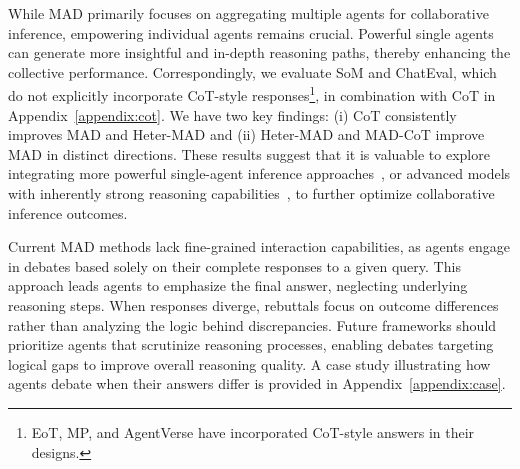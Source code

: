  While MAD primarily focuses on aggregating multiple agents for collaborative inference, empowering individual agents remains crucial. Powerful single agents can generate more insightful and in-depth reasoning paths, thereby enhancing the collective performance. 
Correspondingly, we evaluate SoM and ChatEval, which do not explicitly incorporate CoT-style responses\footnote{EoT, MP, and AgentVerse have incorporated CoT-style answers in their designs.}, in combination with CoT in Appendix~\ref{appendix:cot}. We have two key findings: (i) CoT consistently improves MAD and Heter-MAD and (ii) Heter-MAD and MAD-CoT improve MAD in distinct directions. These results suggest that it is valuable to explore integrating more powerful single-agent inference approaches~\citep{yao2022react, shinn2024reflexion}, or advanced models with inherently strong reasoning capabilities~\citep{guo2025deepseek_r1, liu2024deepseek_v3, o1}, to further optimize collaborative inference outcomes.


 Current MAD methods lack fine-grained interaction capabilities, as agents engage in debates based solely on their complete responses to a given query. This approach leads agents to emphasize the final answer, neglecting underlying reasoning steps. When responses diverge, rebuttals focus on outcome differences rather than analyzing the logic behind discrepancies. Future frameworks should prioritize agents that scrutinize reasoning processes, enabling debates targeting logical gaps to improve overall reasoning quality. A case study illustrating how agents debate when their answers differ is provided in Appendix~\ref{appendix:case}.




